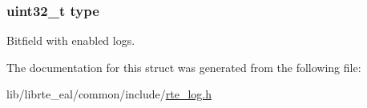 \subsubsection[{type}]{\setlength{\rightskip}{0pt plus 5cm}uint32\+\_\+t type}\label{structrte__logs_ad44b615021ed3ccb734fcaf583ef4a03}
Bitfield with enabled logs. 

The documentation for this struct was generated from the following file\+:\begin{DoxyCompactItemize}
\item 
lib/librte\+\_\+eal/common/include/\hyperlink{rte__log_8h}{rte\+\_\+log.\+h}\end{DoxyCompactItemize}
